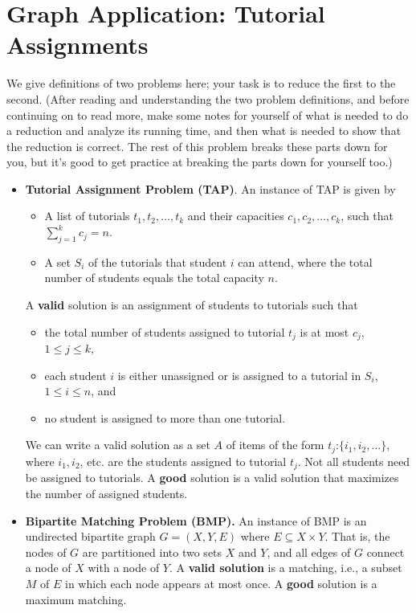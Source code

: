 \documentclass[11pt]{article}
\begin{document}
\section{Graph Application: Tutorial Assignments}
\label{sec-3}
We give definitions of two problems here; your task is to reduce the
first to the second. (After reading and understanding the two problem
definitions, and before continuing on to read more, make some notes
for yourself of what is needed to do a reduction and analyze its
running time, and then what is needed to show that the reduction is
correct. The rest of this problem breaks these parts down for you, but
it's good to get practice at breaking the parts down for yourself
too.)

\begin{itemize}
\item \textbf{Tutorial Assignment Problem (TAP)}. 
An instance of TAP is given by
\begin{itemize}
\item A list of tutorials $t_1, t_2, \ldots, t_k$ and their capacities
$c_1, c_2, \ldots, c_k$, such that $\sum_{j=1}^k c_j = n$.
\item A set $S_i$ of the tutorials that student $i$ can attend, where the total number of
students equals the total capacity $n$.
\end{itemize}
A \textbf{valid} solution is an assignment of students to tutorials such that 
\begin{itemize}
\item the total number of students assigned to tutorial $t_j$ is at most $c_j$, $1\le j \le k$,
\item each student $i$ is either unassigned or is assigned to a tutorial in $S_i$, $1 \le i \le n$, and
\item no student is assigned to more than one tutorial.
\end{itemize}
We can write a valid solution as a set $A$ of items
of the form $t_j$:$\{i_1,i_2,...\}$, where $i_1,i_2$, etc. are
the students assigned to tutorial $t_j$. Not all
students need be assigned to tutorials. A \textbf{good} solution is a
valid solution that maximizes the number of assigned students.

\item \textbf{Bipartite Matching Problem (BMP).} An instance of BMP is an undirected
bipartite graph $G=(X,Y,E)$ where $E \subseteq X \times Y$. That
is, the nodes of $G$ are partitioned into two sets $X$ and $Y$, and
all edges of $G$ connect a node of $X$ with a node of $Y$.  A \textbf{valid
solution} is a matching, i.e., a subset $M$ of $E$ in which each
node appears at most once. A \textbf{good} solution is a maximum matching.
\end{itemize}
\end{document}
